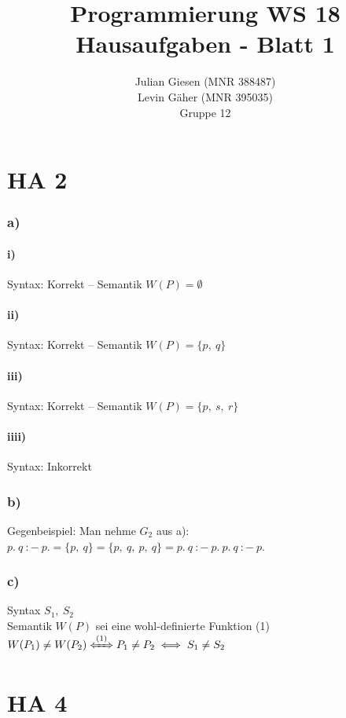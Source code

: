 \documentclass[a4paper]{article}
\title{ Programmierung WS 18 \\ Hausaufgaben - Blatt 1 }
\author{ Julian Giesen (MNR 388487) \\
Levin Gäher (MNR 395035) \\
Gruppe 12 }
\date{  }
\begin{document}
\maketitle

\section* { HA 2 }

\subsubsection*{ a) } 

	\paragraph{ i) ~~ } Syntax: Korrekt  -- Semantik $W(P) = \emptyset $
	\paragraph{ ii) ~ } Syntax: Korrekt  -- Semantik $W(P) = \{ p,~q \} $
	\paragraph{ iii)~ } Syntax: Korrekt  -- Semantik $W(P) = \{ p,~s,~r \} $
	\paragraph{ iiii) } Syntax: Inkorrekt

\subsubsection*{ b) } 
	Gegenbeispiel: Man nehme $G_2$ aus a): \\
	\( p.~q~:-~p. = \{ p,~q \} = \{ p,~q,~p,~q \} = p.~q~:-~p.~p.~q~:-~p. \)

\subsubsection*{ c) } 
	Syntax $S_1,~S_2$ \\
	Semantik $W(P)$ sei eine wohl-definierte Funktion (1) \\
	$W(P_1) \neq W(P_2) \xLeftrightarrow{(1)} P_1 \neq P_2 \iff S_1 \neq S_2 $ \\

\section*{ HA 4 }
\end{document}
